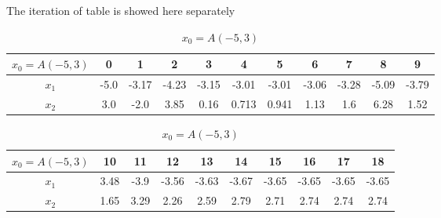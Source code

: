 The iteration of table is showed here separately
\begin{table}[H]
\centering
\setlength{\abovecaptionskip}{0cm} 
\setlength{\belowcaptionskip}{-0.5cm}
\scriptsize
\begin{tabular}{|c|c|c|c|c|c|c|c|c|c|c|}
\hline
$x_0=A(-5,3)$&0&1&2&3&4&5&6&7&8&9\\
\hline
$x_1$&-5.0 & -3.17 & -4.23 & -3.15 & -3.01 & -3.01 & -3.06 & -3.28 & -5.09 & -3.79 \\
\hline
$x_2$&3.0 & -2.0 & 3.85 & 0.16 & 0.713 & 0.941 & 1.13 & 1.6 & 6.28 & 1.52 
\\
\hline
\end{tabular}
\begin{tabular}{|c|c|c|c|c|c|c|c|c|c|}
\hline
$x_0=A(-5,3)$&10&11&12&13&14&15&16&17&18\\
\hline
$x_1$ &3.48 & -3.9 & -3.56 & -3.63 & -3.67 & -3.65 & -3.65 & -3.65 & -3.65\\
\hline
$x_2$ & 1.65 & 3.29 & 2.26 & 2.59 & 2.79 & 2.71 & 2.74 & 2.74 & 2.74
\\
\hline

\end{tabular}
\caption{$x_0=A(-5,3)$}
\end{table}

